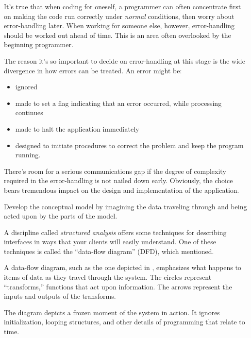 \noindent It's true that when coding for oneself, a programmer can
often concentrate first on making the code run correctly under
\emph{normal} conditions, then worry about error-handling later. When
working for someone else, however, error-handling should be worked out
ahead of time. This is an area often overlooked by the beginning
programmer.

The reason it's so important to decide on error-handling at this stage
is the wide divergence in how errors can be treated. An error might be:

\begin{itemize}
\item ignored
\item made to set a flag indicating that an error occurred, while
processing continues
\item made to halt the application immediately
\item designed to initiate procedures to correct the problem and keep
the program running.
\end{itemize}


There's room for a serious communications gap if the degree of
complexity required in the error-handling is not nailed down early.
Obviously, the choice bears tremendous impact on the design and
implementation of the application.%

\begin{tip}
Develop the conceptual model by imagining the data traveling through and
being acted upon by the parts of the model.
\end{tip}%
A discipline called \emph{structured analysis} \cite{weinberg80}
offers some techniques for describing interfaces in ways that your
clients will easily understand.  One of these techniques is called the
``data-flow diagram'' (DFD), which  mentioned.


A data-flow diagram, such as the one depicted in ,
emphasizes what happens to items of data as they travel through the
system.  The circles represent ``transforms,'' functions that act upon
information.  The arrows represent the inputs and outputs of the
transforms.

The diagram depicts a frozen moment of the system in action. It
ignores initialization, looping structures, and other details of
programming that relate to time.

